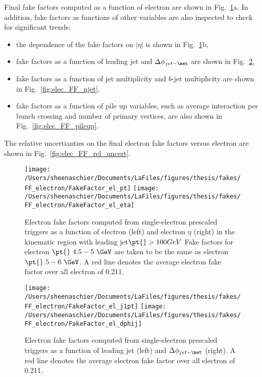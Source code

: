 Final fake factors computed as a function of electron \pt{} are shown in Fig.~\ref{fig:elec_FF_hist}a.  In addition, fake factors as functions of other variables are also inspected to check for significant trends:
\begin{itemize}
\item the dependence of the fake factors on $|\eta|$ is shown in Fig.~\ref{fig:elec_FF_hist}b,
\item fake factors as a function of leading jet \pt{} and  $\Delta\phi_{jet-\met}$ are shown in Fig.~\ref{fig:elec_FF_hadronic},
\item fake factors as a function of jet multiplicity and $b$-jet multiplicity are shown in Fig.~\ref{fig:elec_FF_njet},
\item fake factors as a function of pile up variables, such as average interaction per bunch crossing and number of primary vertices, are also shown in Fig.~\ref{fig:elec_FF_pileup}.
\end{itemize}
The relative uncertianties on the final electron fake factors versus electron \pt{} are shown in Fig.~\ref{fig:elec_FF_rel_uncert}.

\begin{figure}[tbp]
  \centering
  \texttt{[image: /Users/sheenaschier/Documents/LaFiles/figures/thesis/fakes/FF\_electron/FakeFactor\_el\_pt]}
  \texttt{[image: /Users/sheenaschier/Documents/LaFiles/figures/thesis/fakes/FF\_electron/FakeFactor\_el\_eta]}
  \caption{Electron fake factors computed from single-electron prescaled triggers as a function of electron \pt{} (left) and electron $\eta$ (right) in the kinematic region with leading jet$ \pt{}>100GeV$  Fake factors for electron $\pt{}~ 4.5-5~\GeV$ are taken to be the same as electron $\pt{}~5-6~\GeV$.  A red line denotes the average electron fake factor over all electron \pt{} of 0.211. }
  \label{fig:elec_FF_hist}
\end{figure}

\begin{figure}[tbp]
  \centering
  \texttt{[image: /Users/sheenaschier/Documents/LaFiles/figures/thesis/fakes/FF\_electron/FakeFactor\_el\_j1pt]}
  \texttt{[image: /Users/sheenaschier/Documents/LaFiles/figures/thesis/fakes/FF\_electron/FakeFactor\_el\_dphij]}\\
  \caption{Electron fake factors computed from single-electron prescaled triggers as a function of leading jet \pt{} (left) and $\Delta\phi_{jet-\met}$ (right). A red line denotes the average electron fake factor over all electron \pt{} of 0.211.}
  \label{fig:elec_FF_hadronic}
\end{figure}

